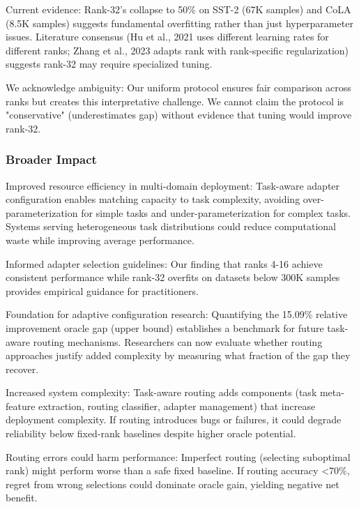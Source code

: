Current evidence: Rank-32's collapse to 50\% on SST-2 (67K samples) and CoLA (8.5K samples) suggests fundamental overfitting rather than just hyperparameter issues. Literature consensus (Hu et al., 2021 uses different learning rates for different ranks; Zhang et al., 2023 adapts rank with rank-specific regularization) suggests rank-32 may require specialized tuning.

We acknowledge ambiguity: Our uniform protocol ensures fair comparison across ranks but creates this interpretative challenge. We cannot claim the protocol is "conservative" (underestimates gap) without evidence that tuning would improve rank-32.

\subsubsection{Broader Impact}

Improved resource efficiency in multi-domain deployment: Task-aware adapter configuration enables matching capacity to task complexity, avoiding over-parameterization for simple tasks and under-parameterization for complex tasks. Systems serving heterogeneous task distributions could reduce computational waste while improving average performance.

Informed adapter selection guidelines: Our finding that ranks 4-16 achieve consistent performance while rank-32 overfits on datasets below 300K samples provides empirical guidance for practitioners.

Foundation for adaptive configuration research: Quantifying the 15.09\% relative improvement oracle gap (upper bound) establishes a benchmark for future task-aware routing mechanisms. Researchers can now evaluate whether routing approaches justify added complexity by measuring what fraction of the gap they recover.

Increased system complexity: Task-aware routing adds components (task meta-feature extraction, routing classifier, adapter management) that increase deployment complexity. If routing introduces bugs or failures, it could degrade reliability below fixed-rank baselines despite higher oracle potential.

Routing errors could harm performance: Imperfect routing (selecting suboptimal rank) might perform worse than a safe fixed baseline. If routing accuracy <70\%, regret from wrong selections could dominate oracle gain, yielding negative net benefit.
